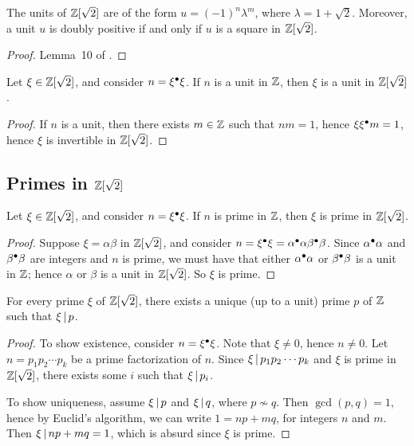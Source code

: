 \begin{lemma}\label{lem-units}
  The units of $\mathbb{Z}[\sqrt2]$ are of the form $u=(-1)^n\lambda^m$, where
  $\lambda=1+\sqrt 2$. Moreover, a unit $u$ is doubly positive if and
  only if $u$ is a square in $\mathbb{Z}[\sqrt2]$.
\end{lemma}

\begin{proof}
  Lemma~10 of {\cite{Selinger-newsynth}}.
\end{proof}

\begin{lemma}
  Let $\xi\in\mathbb{Z}[\sqrt2]$, and consider $n=\xi^{\bullet}\xi$. If $n$ is a unit
  in $\mathbb{Z}$, then $\xi$ is a unit in $\mathbb{Z}[\sqrt2]$.
\end{lemma}

\begin{proof}
  If $n$ is a unit, then there exists $m\in\mathbb{Z}$ such that $nm=1$, hence
  $\xi\xi^{\bullet} m=1$, hence $\xi$ is invertible in $\mathbb{Z}[\sqrt2]$.
\end{proof}

\subsection[{Primes in Z[sqrt 2]}]{Primes in $\mathbb{Z}[\sqrt2]$}

\begin{lemma}\label{lem-prime-criterion}
  Let $\xi\in\mathbb{Z}[\sqrt2]$, and consider $n=\xi^{\bullet}\xi$. If $n$ is prime
  in $\mathbb{Z}$, then $\xi$ is prime in $\mathbb{Z}[\sqrt2]$.
\end{lemma}

\begin{proof}
  Suppose $\xi=\alpha\beta$ in $\mathbb{Z}[\sqrt 2]$, and consider $n =
  \xi^{\bullet}\xi = \alpha^{\bullet}\alpha \beta^{\bullet}\beta$. Since
  $\alpha^{\bullet}\alpha$ and $\beta^{\bullet}\beta$ are integers and $n$ is
  prime, we must have that either $\alpha^{\bullet}\alpha$ or
  $\beta^{\bullet}\beta$ is a unit in $\mathbb{Z}$; hence $\alpha$ or $\beta$ is a
  unit in $\mathbb{Z}[\sqrt 2]$. So $\xi$ is prime.
\end{proof}

\begin{lemma}
  For every prime $\xi$ of $\mathbb{Z}[\sqrt2]$, there exists a unique (up to
  a unit) prime $p$ of $\mathbb{Z}$ such that $\xi \mathop{|}\nolimits p$.
\end{lemma}

\begin{proof}
  To show existence, consider $n=\xi^{\bullet}\xi$. Note that $\xi\neq 0$,
  hence $n\neq 0$. Let $n=p_1p_2\cdots p_k$ be a prime factorization
  of $n$. Since $\xi \mathop{|}\nolimits p_1p_2\cdots p_k$ and $\xi$ is prime in
  $\mathbb{Z}[\sqrt2]$, there exists some $i$ such that $\xi\mathop{|}\nolimits p_i$.

  To show uniqueness, assume $\xi\mathop{|}\nolimits p$ and $\xi\mathop{|}\nolimits q$, where $p\not\sim q$.
  Then $\gcd(p,q)=1$, hence by Euclid's algorithm, we can write
  $1=np+mq$, for integers $n$ and $m$. Then $\xi\mathop{|}\nolimits np+mq=1$, which
  is absurd since $\xi$ is prime. 
\end{proof}

